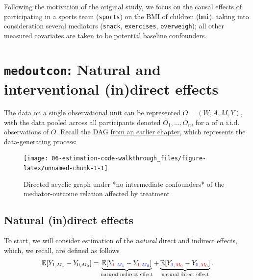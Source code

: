 \documentclass[
  12pt,
]{book}
\newcommand{\passthrough}[1]{#1}
\theoremstyle{definition}
\theoremstyle{definition}
\theoremstyle{definition}
\newcommand{\E}{\mathbb{E}}
\newcommand{\1}{\mathbbm{1}}
\begin{document}
Following the motivation of the original study, we focus on the causal effects
of participating in a sports team (\passthrough{\lstinline!sports!}) on the BMI of children (\passthrough{\lstinline!bmi!}),
taking into consideration several mediators (\passthrough{\lstinline!snack!}, \passthrough{\lstinline!exercises!}, \passthrough{\lstinline!overweigh!});
all other measured covariates are taken to be potential baseline confounders.

\hypertarget{medoutcon-natural-and-interventional-indirect-effects}{%
\section{\texorpdfstring{\texttt{medoutcon}: Natural and interventional (in)direct effects}{medoutcon: Natural and interventional (in)direct effects}}\label{medoutcon-natural-and-interventional-indirect-effects}}

The data on a single observational unit can be represented \(O = (W, A, M, Y)\),
with the data pooled across all participants denoted \(O_1, \ldots, O_n\), for a
of \(n\) i.i.d. observations of \(O\). Recall the DAG \protect\hyperlink{estimands}{from an earlier
chapter}, which represents the data-generating process:

\begin{figure}

{\centering \texttt{[image: 06-estimation-code-walkthrough\_files/figure-latex/unnamed-chunk-1-1]} 

}

\caption{Directed acyclic graph under *no intermediate confounders* of the mediator-outcome relation affected by treatment}\label{fig:unnamed-chunk-1}
\end{figure}

\hypertarget{natural-indirect-effects}{%
\subsection{Natural (in)direct effects}\label{natural-indirect-effects}}

To start, we will consider estimation of the \emph{natural} direct and indirect effects,
which, we recall, are defined as follows
\begin{equation*}
  \E[Y_{1,M_1} - Y_{0,M_0}] = \underbrace{\E[Y_{\color{red}{1},\color{blue}{M_1}} -
    Y_{\color{red}{1},\color{blue}{M_0}}]}_{\text{natural indirect effect}} +
    \underbrace{\E[Y_{\color{blue}{1},\color{red}{M_0}} -
    Y_{\color{blue}{0},\color{red}{M_0}}]}_{\text{natural direct effect}}.
\end{equation*}
\end{document}
